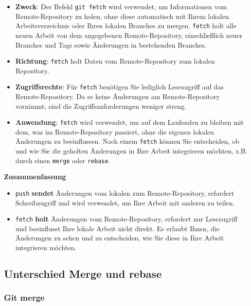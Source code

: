 \documentclass{vorlage-design-main}
\begin{document}
\begin{itemize}

\item
  \textbf{Zweck}: Der Befehl \verb|git fetch| wird
  verwendet, um Informationen vom Remote-Repository zu holen, ohne diese
  automatisch mit Ihrem lokalen Arbeitsverzeichnis oder Ihren lokalen
  Branches zu mergen. \verb|fetch| holt alle neuen
  Arbeit von dem angegebenen Remote-Repository, einschließlich neuer
  Branches und Tags sowie Änderungen in bestehenden Branches.
\item
  \textbf{Richtung}: \verb|fetch| holt Daten vom
  Remote-Repository zum lokalen Repository.
\item
  \textbf{Zugriffsrechte}: Für \verb|fetch| benötigen
  Sie lediglich Lesezugriff auf das Remote-Repository. Da es keine
  Änderungen am Remote-Repository vornimmt, sind die
  Zugriffsanforderungen weniger streng.
\item
  \textbf{Anwendung}: \verb|fetch| wird verwendet, um
  auf dem Laufenden zu bleiben mit dem, was im Remote-Repository
  passiert, ohne die eigenen lokalen Änderungen zu beeinflussen. Nach
  einem \verb|fetch| können Sie entscheiden, ob und
  wie Sie die geholten Änderungen in Ihre Arbeit integrieren möchten,
  z.B. durch einen \verb|merge| oder
  \verb|rebase|.
\end{itemize}

\textbf{Zusammenfassung}

\begin{itemize}

\item
  \verb|push| \textbf{sendet} Änderungen vom lokalen
  zum Remote-Repository, erfordert Schreibzugriff und wird verwendet, um
  Ihre Arbeit mit anderen zu teilen.
\item
  \verb|fetch| \textbf{holt} Änderungen vom
  Remote-Repository, erfordert nur Lesezugriff und beeinflusst Ihre
  lokale Arbeit nicht direkt. Es erlaubt Ihnen, die Änderungen zu sehen
  und zu entscheiden, wie Sie diese in Ihre Arbeit integrieren möchten.
\end{itemize}

\hypertarget{unterschied-merge-und-rebase}{%
\subsection{Unterschied Merge und
rebase}\label{unterschied-merge-und-rebase}}

\hypertarget{git-merge}{%
\subsubsection{Git merge}\label{git-merge}}
\end{document}
